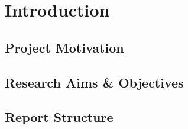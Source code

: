 \chapter{Introduction} %
\label{Chapter1}
\blindtext
\parencite{White2018-ai}
\parencite{Acheson1990-cp}
\parencite{Bai2014}


\section{Project Motivation}

\section{Research Aims \& Objectives}

\section{Report Structure}
